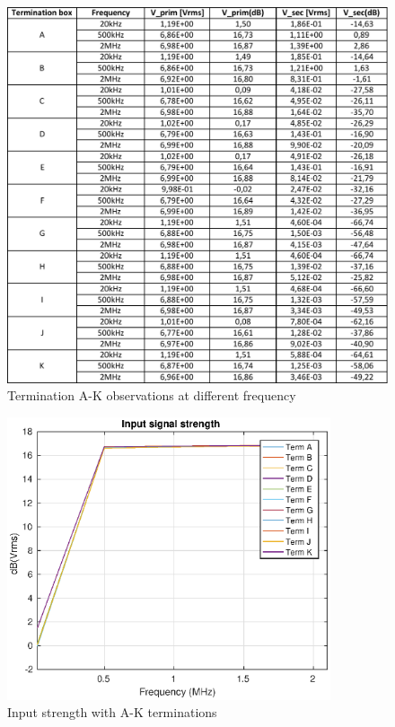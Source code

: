 \documentclass[12pt,a4paper,UKenglish]{article}
\begin{document}
\begin{figure} [H] %
  \centering 
  \includegraphics[width=1\textwidth]{img/task8_data.pdf} 
  \caption{Termination A-K observations at different frequency}
  \label{fig:task8} 
\end{figure}

\begin{figure} [H] %
  \centering 
  \includegraphics[width=0.85\textwidth]{img/input.eps} 
  \caption{Input strength with A-K terminations}
  \label{fig:task8in} 
\end{figure}
\end{document}
